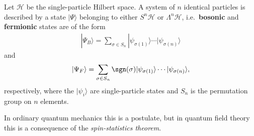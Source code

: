     \begin{axiom}
        Let $\mathcal{H}$ be the single-particle Hilbert space. A system of $n$ identical particles is described by a state $|\Psi\rangle$ belonging to either $S^n\mathcal{H}$ or $\Lambda^n\mathcal{H}$, i.e.~\textbf{bosonic} and \textbf{fermionic} states are of the form
        \begin{gather}
            |\Psi_B\rangle = \sum_{\sigma\in S_n}|\psi_{\sigma(1)}\rangle\cdots|\psi_{\sigma(n)}\rangle
        \end{gather}
        and
        \begin{gather}
            |\Psi_F\rangle = \sum_{\sigma\in S_n}\sgn(\sigma)|\psi_{\sigma(1)}\rangle\cdots|\psi_{\sigma(n)}\rangle,
        \end{gather}
        respectively, where the $|\psi_i\rangle$ are single-particle states and $S_n$ is the permutation group on $n$ elements.
    \end{axiom}
    \begin{remark}
        In ordinary quantum mechanics this is a postulate, but in quantum field theory this is a consequence of the \textit{spin-statistics theorem}.
    \end{remark}


\section{}

